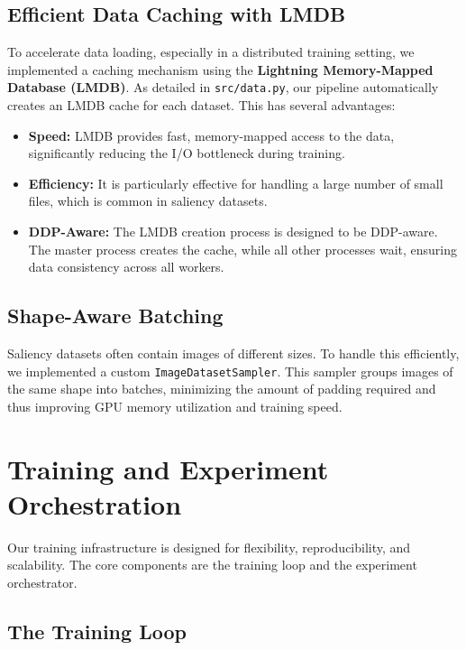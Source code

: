 \subsection{Efficient Data Caching with LMDB}

To accelerate data loading, especially in a distributed training setting, we implemented a caching mechanism using the \textbf{Lightning Memory-Mapped Database (LMDB)}. As detailed in \texttt{src/data.py}, our pipeline automatically creates an LMDB cache for each dataset. This has several advantages:

\begin{itemize}
    \item \textbf{Speed:} LMDB provides fast, memory-mapped access to the data, significantly reducing the I/O bottleneck during training.
    \item \textbf{Efficiency:} It is particularly effective for handling a large number of small files, which is common in saliency datasets.
    \item \textbf{DDP-Aware:} The LMDB creation process is designed to be DDP-aware. The master process creates the cache, while all other processes wait, ensuring data consistency across all workers.
\end{itemize}

\subsection{Shape-Aware Batching}

Saliency datasets often contain images of different sizes. To handle this efficiently, we implemented a custom \texttt{ImageDatasetSampler}. This sampler groups images of the same shape into batches, minimizing the amount of padding required and thus improving GPU memory utilization and training speed.

\section{Training and Experiment Orchestration}
\label{sec:orchestration}

Our training infrastructure is designed for flexibility, reproducibility, and scalability. The core components are the training loop and the experiment orchestrator.

\subsection{The Training Loop}

